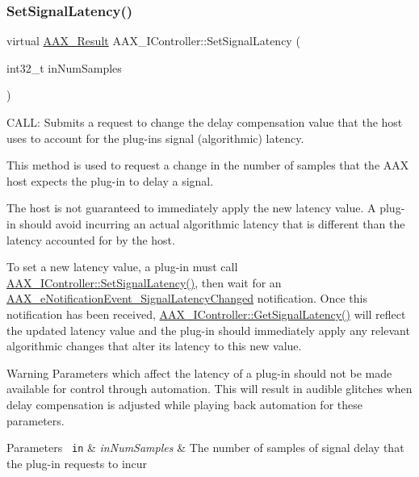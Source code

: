 \subsubsection{\texorpdfstring{SetSignalLatency()}{SetSignalLatency()}}
{\footnotesize\ttfamily virtual \mbox{\hyperlink{a00392_a4d8f69a697df7f70c3a8e9b8ee130d2f}{A\+A\+X\+\_\+\+Result}} A\+A\+X\+\_\+\+I\+Controller\+::\+Set\+Signal\+Latency (\begin{DoxyParamCaption}\item[{int32\+\_\+t}]{in\+Num\+Samples }\end{DoxyParamCaption})\hspace{0.3cm}{\ttfamily [pure virtual]}}



C\+A\+LL\+: Submits a request to change the delay compensation value that the host uses to account for the plug-\/in\textquotesingle{}s signal (algorithmic) latency. 

This method is used to request a change in the number of samples that the A\+AX host expects the plug-\/in to delay a signal.

The host is not guaranteed to immediately apply the new latency value. A plug-\/in should avoid incurring an actual algorithmic latency that is different than the latency accounted for by the host.

To set a new latency value, a plug-\/in must call \mbox{\hyperlink{a01789_af2c648879419d94971c1308d8698601f}{A\+A\+X\+\_\+\+I\+Controller\+::\+Set\+Signal\+Latency()}}, then wait for an \mbox{\hyperlink{a00491_afab5ea2cfd731fc8f163b6caa685406ea06ab4b075ecb523d0dde3ec19b76a756}{A\+A\+X\+\_\+e\+Notification\+Event\+\_\+\+Signal\+Latency\+Changed}} notification. Once this notification has been received, \mbox{\hyperlink{a01789_ad50aa6fd54e39623a58debd63d9551e1}{A\+A\+X\+\_\+\+I\+Controller\+::\+Get\+Signal\+Latency()}} will reflect the updated latency value and the plug-\/in should immediately apply any relevant algorithmic changes that alter its latency to this new value.

\begin{DoxyWarning}{Warning}
Parameters which affect the latency of a plug-\/in should not be made available for control through automation. This will result in audible glitches when delay compensation is adjusted while playing back automation for these parameters.
\end{DoxyWarning}

\begin{DoxyParams}[1]{Parameters}
\mbox{\texttt{ in}}  & {\em in\+Num\+Samples} & The number of samples of signal delay that the plug-\/in requests to incur \\
\hline
\end{DoxyParams}


